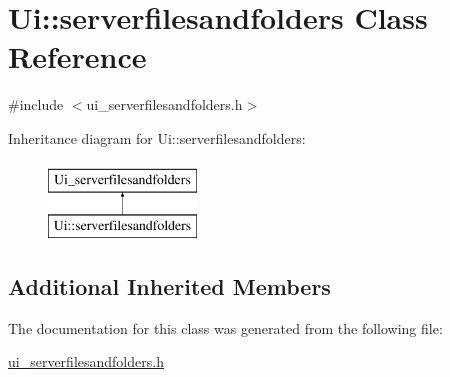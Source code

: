 \hypertarget{classUi_1_1serverfilesandfolders}{\section{Ui\-:\-:serverfilesandfolders Class Reference}
\label{classUi_1_1serverfilesandfolders}
}


{\ttfamily \#include $<$ui\-\_\-serverfilesandfolders.\-h$>$}

Inheritance diagram for Ui\-:\-:serverfilesandfolders\-:\begin{figure}[H]
\begin{center}
\leavevmode
\includegraphics[height=2.000000cm]{classUi_1_1serverfilesandfolders}
\end{center}
\end{figure}
\subsection*{Additional Inherited Members}


The documentation for this class was generated from the following file\-:\begin{DoxyCompactItemize}
\item 
\hyperlink{ui__serverfilesandfolders_8h}{ui\-\_\-serverfilesandfolders.\-h}\end{DoxyCompactItemize}
